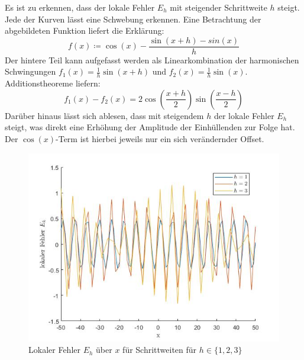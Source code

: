 \documentclass[a4paper, 10pt,onecolumn]{scrartcl}
\begin{document}
Es ist zu erkennen, dass der lokale Fehler $E_h$ mit steigender Schrittweite $h$ steigt. Jede der Kurven lässt eine Schwebung erkennen. Eine Betrachtung der abgebildeten Funktion liefert die Erklärung:
\[
f(x)\coloneqq \cos(x) - \frac{\sin(x+h)-sin(x)}{h}
\]
Der hintere Teil kann aufgefasst werden als Linearkombination der harmonischen Schwingungen $f_1(x)=\frac{1}{h} \sin(x+h)$ und $f_2(x)=\frac{1}{h}\sin(x)$. Additionstheoreme liefern: 
\[
f_1(x)-f_2(x)=2\cos\left(\frac{x+h}{2}\right)\sin\left(\frac{x-h}{2}\right)
\]  
Darüber hinaus lässt sich ablesen, dass mit steigendem $h$ der lokale Fehler $E_h$ steigt, was direkt eine Erhöhung der Amplitude der Einhüllenden zur Folge hat. Der $\cos(x)$-Term ist hierbei jeweils nur ein sich verändernder Offset.
\begin{figure}[ht!]
	\centering
	\includegraphics[scale=0.5]{scndplt_latex.jpg}
	\caption{Lokaler Fehler $E_h$ über $x$ für Schrittweiten für $h \in \{1,2,3\}$}
\end{figure}
\end{document}
